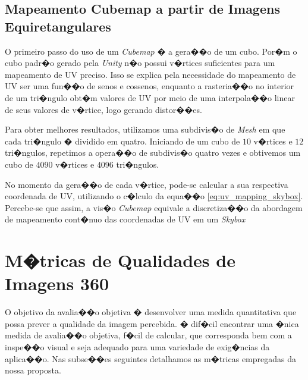 \documentclass[12pt]{article}
\begin{document}
\subsection{Mapeamento Cubemap a partir de Imagens Equiretangulares} \label{subsec:equicubemap}

O primeiro passo do uso de um \textit{Cubemap} � a gera��o de um cubo. Por�m o cubo padr�o gerado pela \textit{Unity} n�o possui v�rtices suficientes para um mapeamento de UV preciso. Isso se explica pela necessidade do mapeamento de UV ser uma fun��o de senos e cossenos, enquanto a rasteria��o no interior de um tri�ngulo obt�m valores de UV por meio de uma interpola��o linear de seus valores de v�rtice, logo gerando distor��es. 

Para obter melhores resultados, utilizamos uma subdivis�o de \textit{Mesh} em que cada tri�ngulo � dividido em quatro. Iniciando de um cubo de $10$ v�rtices e $12$ tri�ngulos, repetimos a opera��o de subdivis�o quatro vezes e obtivemos um cubo de $4090$ v�rtices e $4096$ tri�ngulos.

No momento da gera��o de cada v�rtice, pode-se calcular a sua respectiva coordenada de UV, utilizando o c�lculo da equa��o \ref{eq:uv_mapping_skybox}. Percebe-se que assim, a vis�o \textit{Cubemap} equivale a discretiza��o da abordagem de mapeamento cont�nuo das coordenadas de UV em um \textit{Skybox}









\section{M�tricas de Qualidades de Imagens 360}  \label{sec:metrics}

O objetivo da avalia��o objetiva � desenvolver uma medida quantitativa que possa prever a qualidade da imagem percebida. � dif�cil encontrar uma �nica medida de avalia��o objetiva, f�cil de calcular, que corresponda bem com a inspe��o visual e seja adequado para uma variedade de exig�ncias da aplica��o. Nas subse��es seguintes detalhamos as m�tricas empregadas da nossa proposta.
\end{document}
